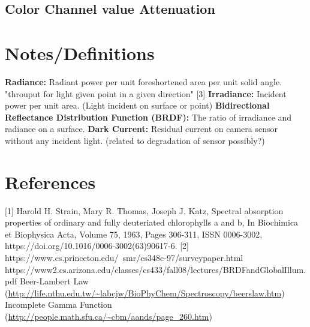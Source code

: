 \documentclass{article}
\begin{document}
\subsection{Color Channel value Attenuation}



\section{Notes/Definitions}

\textbf{Radiance:} Radiant power per unit foreshortened area per unit solid angle. "throuput for light given point in a given direction" [3]
\newline
\textbf{Irradiance:} Incident power per unit area. (Light incident on surface or point)
\newline
\textbf{Bidirectional Reflectance Distribution Function (BRDF):} The ratio of irradiance and radiance on a surface.
\textbf{Dark Current:} Residual current on camera sensor without any incident light. (related to degradation of sensor possibly?)



\section{References}

[1] Harold H. Strain, Mary R. Thomas, Joseph J. Katz, Spectral absorption properties of ordinary and fully deuteriated chlorophylls a and b,
In Biochimica et Biophysica Acta, Volume 75, 1963, Pages 306-311,
ISSN 0006-3002, https://doi.org/10.1016/0006-3002(63)90617-6. \newline
[2] https://www.cs.princeton.edu/~smr/cs348c-97/surveypaper.html \newline
[3] https://www2.cs.arizona.edu/classes/cs433/fall08/lectures/BRDFandGlobalIllum.pdf
\newline
[4] Beer-Lambert Law (\url{http://life.nthu.edu.tw/~labcjw/BioPhyChem/Spectroscopy/beerslaw.htm}) \newline
[5] Incomplete Gamma Function (\url{http://people.math.sfu.ca/~cbm/aands/page_260.htm})
\end{document}
